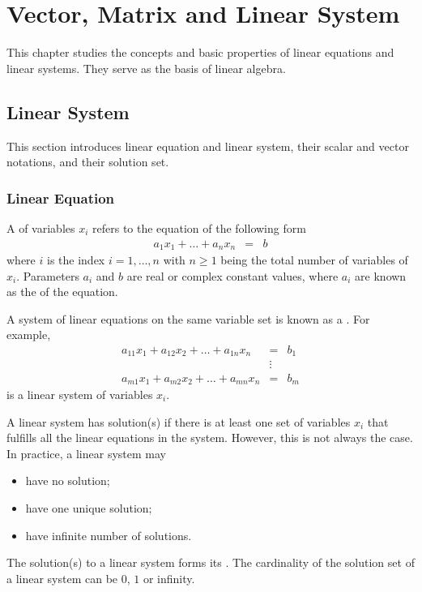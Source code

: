 \chapter{Vector, Matrix and Linear System}

This chapter studies the concepts and basic properties of linear equations and linear systems. They serve as the basis of linear algebra.

\section{Linear System}

This section introduces linear equation and linear system, their scalar and vector notations, and their solution set.

\subsection{Linear Equation}

A  of variables $x_i$ refers to the equation of the following form
\begin{eqnarray}
  a_1 x_1 + \ldots + a_n x_n &=& b \nonumber
\end{eqnarray}
where $i$ is the index $i=1,\ldots, n$ with $n\geq 1$ being the total number of variables of $x_i$. Parameters $a_i$ and $b$ are real or complex constant values, where $a_i$ are known as the  of the equation. 

A system of linear equations on the same variable set is known as a . For example,
\begin{eqnarray}
a_{11} x_1 + a_{12} x_2 + \ldots + a_{1n} x_n &=& b_1 \nonumber \\
& \vdots & \nonumber \\
a_{m1} x_1 + a_{m2} x_2 + \ldots + a_{mn} x_n &=& b_m \nonumber
\end{eqnarray}
is a linear system of variables $x_i$. 

A linear system has solution(s) if there is at least one set of variables $x_i$ that fulfills all the linear equations in the system. However, this is not always the case. In practice, a linear system may 
\begin{itemize}
  \item have no solution;
  \item have one unique solution;
  \item have infinite number of solutions.
\end{itemize}
The solution(s) to a linear system forms its . The cardinality of the solution set of a linear system can be $0$, $1$ or infinity.

